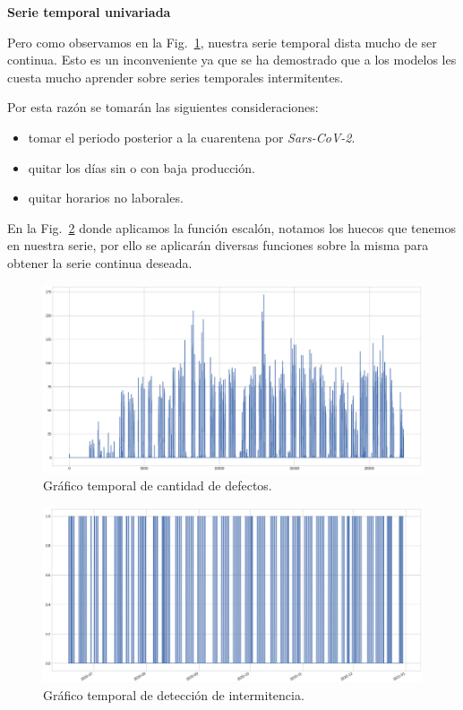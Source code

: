 \documentclass[a4paper,12pt]{article}
\begin{document}
		\clearpage				
						
		\textbf{Serie temporal univariada}
						
		Pero como observamos en la Fig.~\ref{fig:graf_cantdef_antes}, nuestra serie temporal dista mucho de ser continua. Esto es un inconveniente ya que se ha demostrado que a los modelos les cuesta mucho aprender sobre series temporales intermitentes.
						
		Por esta razón se tomarán las siguientes consideraciones:
						
		\begin{itemize}[noitemsep, topsep=2pt]
			\item tomar el periodo posterior a la cuarentena por \textit{Sars-CoV-2}.
			\item quitar los días sin o con baja producción.
			\item quitar horarios no laborales.
		\end{itemize}
						
		En la Fig.~\ref{fig:graf_inter_antes} donde aplicamos la función escalón, notamos los huecos que tenemos en nuestra serie, por ello se aplicarán diversas funciones sobre la misma para obtener la serie continua deseada.
				
		\begin{figure}[]
			\begin{center}
				\includegraphics[width=1\textwidth]{tesis_78.png}
				\caption{Gráfico temporal de cantidad de defectos.}
				\label{fig:graf_cantdef_antes}
			\end{center}
		\end{figure}
						
		\begin{figure}[]
			\begin{center}
				\includegraphics[width=1\textwidth]{tesis_79.png}
				\caption{Gráfico temporal de detección de intermitencia.}
				\label{fig:graf_inter_antes}
			\end{center}
		\end{figure}
						
\end{document}

